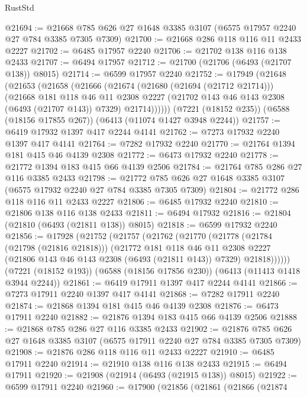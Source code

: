 \begin{lexlean}{RustStd}
\begin{coremodule}
@21694 := @21668 @785 @626 @27 @1648 @3385 @3107 (@6575 @17957 @2240 @27 @784 @3385 @7305 @7309)
@21700 := @21668 @286 @118 @116 @11 @2433 @2227
@21702 := @6485 @17957 @2240
@21706 := @21702 @138 @116 @138 @2433
@21707 := @6494 @17957
@21712 := @21700 (@21706 (@6493 (@21707 @138)) @8015)
@21714 := @6599 @17957 @2240
@21752 := @17949
    (@21648
      (@21653
        (@21658
          (@21666
            (@21674
              (@21680 (@21694 (@21712 @21714)))
              (@21668
                @181
                @118
                @46
                @11
                @2308
                @2227
                (@21702 @143 @46 @143 @2308 (@6493 (@21707 @143)) @7329)
                @21714))))))
    (@7221 (@18152 @235))
    (@6588 (@18156 @17855 @267))
    (@6413 (@11074 @1427 @3948 @2244))
@21757 := @6419 @17932 @1397 @417 @2244 @4141
@21762 := @7273 @17932 @2240 @1397 @417 @4141
@21764 := @7282 @17932 @2240
@21770 := @21764 @1394 @181 @415 @46 @4139 @2308
@21772 := @6473 @17932 @2240
@21778 := @21772 @1394 @183 @415 @66 @4139 @2506
@21784 := @21764 @785 @286 @27 @116 @3385 @2433
@21798 := @21772 @785 @626 @27 @1648 @3385 @3107 (@6575 @17932 @2240 @27 @784 @3385 @7305 @7309)
@21804 := @21772 @286 @118 @116 @11 @2433 @2227
@21806 := @6485 @17932 @2240
@21810 := @21806 @138 @116 @138 @2433
@21811 := @6494 @17932
@21816 := @21804 (@21810 (@6493 (@21811 @138)) @8015)
@21818 := @6599 @17932 @2240
@21856 := @17928
    (@21752
      (@21757
        (@21762
          (@21770
            (@21778
              (@21784 (@21798 (@21816 @21818)))
              (@21772
                @181
                @118
                @46
                @11
                @2308
                @2227
                (@21806 @143 @46 @143 @2308 (@6493 (@21811 @143)) @7329)
                @21818))))))
    (@7221 (@18152 @193))
    (@6588 (@18156 @17856 @230))
    (@6413 (@11413 @1418 @3944 @2244))
@21861 := @6419 @17911 @1397 @417 @2244 @4141
@21866 := @7273 @17911 @2240 @1397 @417 @4141
@21868 := @7282 @17911 @2240
@21874 := @21868 @1394 @181 @415 @46 @4139 @2308
@21876 := @6473 @17911 @2240
@21882 := @21876 @1394 @183 @415 @66 @4139 @2506
@21888 := @21868 @785 @286 @27 @116 @3385 @2433
@21902 := @21876 @785 @626 @27 @1648 @3385 @3107 (@6575 @17911 @2240 @27 @784 @3385 @7305 @7309)
@21908 := @21876 @286 @118 @116 @11 @2433 @2227
@21910 := @6485 @17911 @2240
@21914 := @21910 @138 @116 @138 @2433
@21915 := @6494 @17911
@21920 := @21908 (@21914 (@6493 (@21915 @138)) @8015)
@21922 := @6599 @17911 @2240
@21960 := @17900
    (@21856
      (@21861
        (@21866
          (@21874

\end{coremodule}
\end{lexlean}
